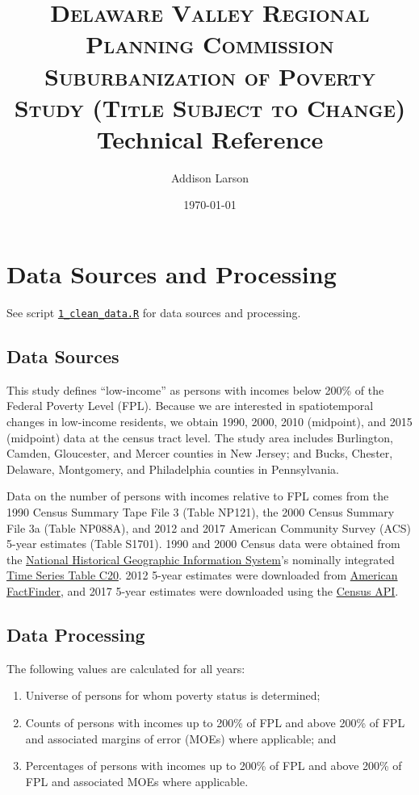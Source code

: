 \documentclass[paper=letterpaper, fontsize=11pt]{scrartcl}
\title{	
\normalfont \normalsize 
\textsc{Delaware Valley Regional Planning Commission \\ Suburbanization of Poverty Study (Title Subject to Change)} \\ [25pt]
\huge Technical Reference \\
}
\author{Addison Larson}
\date{\normalsize\today}
\begin{document}
\maketitle

\section{Data Sources and Processing}
See script \href{https://github.com/addisonlarson/SoP/blob/master/1_clean_data.R}{\texttt{1\_clean\_data.R}} for data sources and processing.
\subsection{Data Sources}
This study defines ``low-income'' as persons with incomes below 200\% of the Federal Poverty Level (FPL). Because we are interested in spatiotemporal changes in low-income residents, we obtain 1990, 2000, 2010 (midpoint), and 2015 (midpoint) data at the census tract level. The study area includes Burlington, Camden, Gloucester, and Mercer counties in New Jersey; and Bucks, Chester, Delaware, Montgomery, and Philadelphia counties in Pennsylvania.

Data on the number of persons with incomes relative to FPL comes from the 1990 Census Summary Tape File 3 (Table NP121), the 2000 Census Summary File 3a (Table NP088A), and 2012 and 2017 American Community Survey (ACS) 5-year estimates (Table S1701). 1990 and 2000 Census data were obtained from the \href{https://www.nhgis.org/}{National Historical Geographic Information System}'s nominally integrated \href{https://www.nhgis.org/documentation/time-series#details}{Time Series Table C20}. 2012 5-year estimates were downloaded from \href{https://factfinder.census.gov/faces/nav/jsf/pages/index.xhtml}{American FactFinder}, and 2017 5-year estimates were downloaded using the \href{https://www.census.gov/data/developers/data-sets/acs-5year.html}{Census API}.

\subsection{Data Processing}
The following values are calculated for all years:
\begin{enumerate}
	\item Universe of persons for whom poverty status is determined;
	\item Counts of persons with incomes up to 200\% of FPL and above 200\% of FPL and associated margins of error (MOEs) where applicable; and
	\item Percentages of persons with incomes up to 200\% of FPL and above 200\% of FPL and associated MOEs where applicable.
\end{enumerate}
\end{document}
